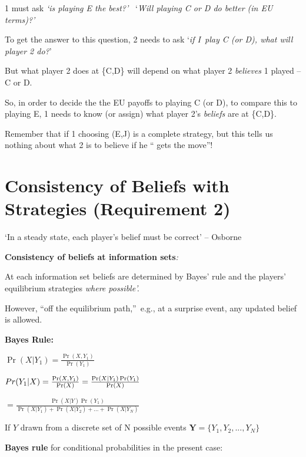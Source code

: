 \documentclass{article}
\begin{document}
1 must ask \textit{`is playing E the best?'} \ `\textit{Will playing C or D
do better (in EU terms)?'}

To get the answer to this question, 2 needs to ask `\textit{if I\ play C (or
D), what will player 2 do?}'

\bigskip

But what player 2 does at \{C,D\} will depend on what player 2 \textit{%
believes }1 played -- C or D.

So, in order to decide the the EU payoffs to playing C (or D), to compare
this to playing E, 1 needs to know (or assign) what player 2's \textit{%
beliefs }are at \{C,D\}.

{\footnotesize Remember that if 1 choosing (E,J) is a complete strategy, but
this tells us nothing about what 2 is to believe if he \textquotedblleft
gets the move\textquotedblright !}

\bigskip

\section{Consistency of Beliefs with Strategies (Requirement 2)}

`In a steady state, each player's belief must be correct' -- Osborne

\bigskip

\textbf{Consistency of beliefs at information sets}\textit{:}

At each information set beliefs are determined by Bayes' rule and the
players' equilibrium strategies \textit{where possible'.}

However, \textquotedblleft off the equilibrium path,\textquotedblright\
e.g., at a surprise event, any updated belief is allowed.\bigskip

\textbf{Bayes Rule:}

$\Pr (X|Y_{1})=\frac{\Pr (X,Y_{1})}{\Pr (Y_{1})}$

\bigskip

$Pr(Y_{1}|X)=\frac{\Pr (X,Y_{1})}{\Pr (X)}=\frac{\Pr (X|Y_{1})\Pr (Y_{1})}{%
\Pr (X)}$

$=\frac{\Pr (X|Y)\Pr (Y_{1})}{\Pr (X|Y_{1})+\Pr (X|Y_{2})+...+\Pr (X|Y_{N})}$

\bigskip

If $Y$ drawn from a discrete set of N possible events $\mathbf{Y=}%
\{Y_{1},Y_{2},...,Y_{N}\}$

\bigskip

\textbf{Bayes rule} for conditional probabilities in the present case:
\end{document}
